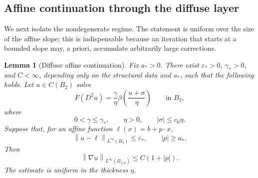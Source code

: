 \documentclass[11pt,letterpaper]{amsart}
\numberwithin{equation}{section}
\newcommand{\norm}[1]{\left\lVert #1\right\rVert}
\newtheorem{lemma}[theorem]{Lemma}
\theoremstyle{definition}
\theoremstyle{remark}
\begin{document}
\subsection{Affine continuation through the diffuse layer}

We next isolate the nondegenerate regime. The statement is uniform over
the size of the affine slope; this is indispensable because an iteration
that starts at a bounded slope may, a priori, accumulate arbitrarily large
corrections.

\begin{lemma}[Diffuse affine continuation]
\label{lem:diffuse-affine-continuation}
Fix $a_*>0$. There exist $\varepsilon_*>0$, $\gamma_*>0$, and
$C<\infty$, depending only on the structural data and $a_*$, such that the
following holds. Let $u\in C(B_2)$ solve
\begin{equation}\label{eq:affine-continuation-equation}
F(D^2u)
=
\frac{\gamma}{\eta}
\beta\left(\frac{u+\sigma}{\eta}\right)
\qquad\text{in }B_2,
\end{equation}
where
$$
0<\gamma\leq\gamma_*,
\qquad
\eta>0,
\qquad
|\sigma|\leq c_0\eta.
$$
Suppose that, for an affine function $\ell(x)=b+p\cdot x$,
\begin{equation}\label{eq:initial-affine-trapping}
\norm{u-\ell}_{L^\infty(B_1)}\leq\varepsilon_*,
\qquad
|p|\geq a_*.
\end{equation}
Then
\begin{equation}\label{eq:affine-continuation-lipschitz}
\norm{\nabla u}_{L^\infty(B_{1/2})}
\leq
C(1+|p|).
\end{equation}
The estimate is uniform in the thickness $\eta$.
\end{lemma}
\end{document}
